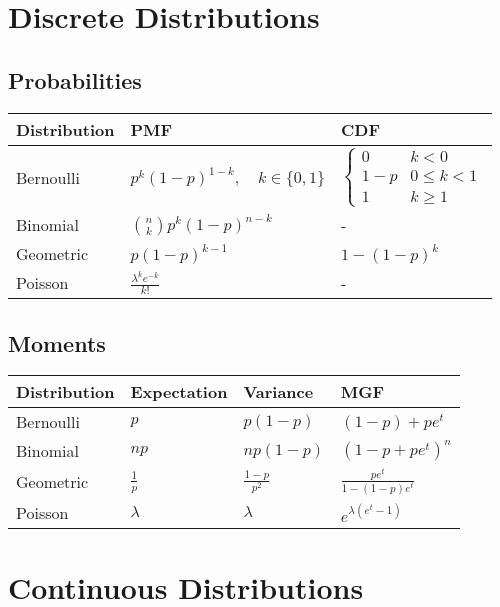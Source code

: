 


\section*{Discrete Distributions}
\subsection*{Probabilities}
\begin{center}
  \begin{tabularx}{\textwidth}{XXX}
	\toprule
	Distribution & PMF & CDF\\
	\midrule
	Bernoulli & $p^k (1-p)^{1-k}, \quad k\in\{0, 1\}$ & $\begin{cases} 0 & k < 0 \\ 1 - p & 0 \leq k < 1 \\ 1 & k \geq 1 \end{cases}$\\
	Binomial & $ {n \choose k} p^k (1-p)^{n-k} $ & - \\
	Geometric & $ p(1-p)^{k-1}$ & $1 - (1 - p)^k$\\
	Poisson & $\frac{\lambda^ke^{-k}}{k!}$ & -
  \end{tabularx}
\end{center}

\subsection*{Moments}
\begin{center}
  \begin{tabularx}{\textwidth}{XXXX}
	\toprule
	Distribution & Expectation & Variance & MGF\\
	\midrule
	Bernoulli & $p$ & $p(1-p)$ & $(1-p) + pe^t$\\
	Binomial & $np$ & $np(1-p)$ & $(1-p + pe^t)^n$\\
	Geometric & $\frac{1}{p}$ & $\frac{1-p}{p^2}$ & $\frac{pe^t}{1-(1-p)e^t}$\\
	Poisson & $\lambda$ & $\lambda$ & $e^{\lambda(e^t - 1)}$
  \end{tabularx}
\end{center}

\section*{Continuous Distributions}
